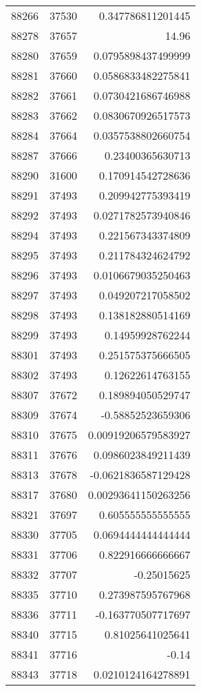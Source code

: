 \begin{tabular}{r | r | r}
88266 & 37530 & 0.347786811201445 \\
88278 & 37657 & 14.96 \\
88280 & 37659 & 0.0795898437499999 \\
88281 & 37660 & 0.0586833482275841 \\
88282 & 37661 & 0.0730421686746988 \\
88283 & 37662 & 0.0830670926517573 \\
88284 & 37664 & 0.0357538802660754 \\
88287 & 37666 & 0.23400365630713 \\
88290 & 31600 & 0.170914542728636 \\
88291 & 37493 & 0.209942775393419 \\
88292 & 37493 & 0.0271782573940846 \\
88294 & 37493 & 0.221567343374809 \\
88295 & 37493 & 0.211784324624792 \\
88296 & 37493 & 0.0106679035250463 \\
88297 & 37493 & 0.049207217058502 \\
88298 & 37493 & 0.138182880514169 \\
88299 & 37493 & 0.14959928762244 \\
88301 & 37493 & 0.251575375666505 \\
88302 & 37493 & 0.12622614763155 \\
88307 & 37672 & 0.189894050529747 \\
88309 & 37674 & -0.58852523659306 \\
88310 & 37675 & 0.00919206579583927 \\
88311 & 37676 & 0.0986023849211439 \\
88313 & 37678 & -0.0621836587129428 \\
88317 & 37680 & 0.00293641150263256 \\
88321 & 37697 & 0.605555555555555 \\
88330 & 37705 & 0.0694444444444444 \\
88331 & 37706 & 0.822916666666667 \\
88332 & 37707 & -0.25015625 \\
88335 & 37710 & 0.273987595767968 \\
88336 & 37711 & -0.163770507717697 \\
88340 & 37715 & 0.81025641025641 \\
88341 & 37716 & -0.14 \\
88343 & 37718 & 0.0210124164278891 \\

\end{tabular}

